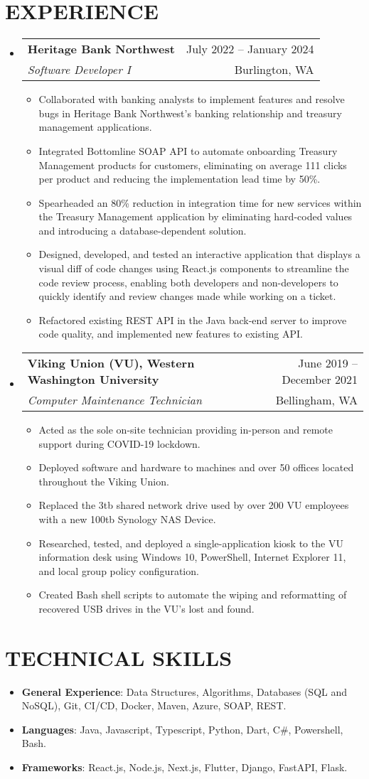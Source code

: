\documentclass[letterpaper,11pt]{article}
\makeatletter
\newcommand{\resumeItem}[1]{
    \item\small{
            {#1 \vspace{-1pt}}
        }
    }
\newcommand{\resumeSubheading}[4]{
        \vspace{-1pt}\item
        \begin{tabular*}{\textwidth}[t]{l@{\extracolsep{\fill}}r}
            \textbf{\large #1} & {\small #2}\vspace{1pt}\\ %
            \textit{#3} & {\small #4}\\ %
        \end{tabular*}\vspace{-4pt}
    }
\newcommand{\resumeSubHeadingListStart}{\begin{itemize}[leftmargin=0in, label={}]}
\newcommand{\resumeSubHeadingListEnd}{\end{itemize}}
\newcommand{\resumeItemListStart}{\begin{itemize}}
\newcommand{\resumeItemListEnd}{\end{itemize}\vspace{0pt}}
\makeatother
\begin{document}
\section{EXPERIENCE}
\resumeSubHeadingListStart

\resumeSubheading
{Heritage Bank Northwest}{July 2022 -- January 2024}
{Software Developer I}{Burlington, WA}
\resumeItemListStart
\resumeItem{Collaborated with banking analysts to implement features and resolve bugs in Heritage Bank Northwest's banking relationship and treasury management applications.}
\resumeItem{Integrated Bottomline SOAP API to automate onboarding Treasury Management products for customers, eliminating on average 111 clicks per product and reducing the implementation lead time by 50\%.}
\resumeItem{Spearheaded an 80\% reduction in integration time for new services within the Treasury Management application by eliminating hard-coded values and introducing a database-dependent solution.}
\resumeItem{Designed, developed, and tested an interactive application that displays a visual diff of code changes using React.js components to streamline the code review process, enabling both developers and non-developers to quickly identify and review changes made while working on a ticket.}
\resumeItem{Refactored existing REST API in the Java back-end server to improve code quality, and implemented new features to existing API.}
\resumeItemListEnd

\resumeSubheading
{Viking Union (VU), Western Washington University}{June 2019 -- December 2021}
{Computer Maintenance Technician}{Bellingham, WA}
\resumeItemListStart
\resumeItem{Acted as the sole on-site technician providing in-person and remote support during COVID-19 lockdown.}
\resumeItem{Deployed software and hardware to machines and over 50 offices located throughout the Viking Union.}
\resumeItem{Replaced the 3tb shared network drive used by over 200 VU employees with a new 100tb Synology NAS Device.}
\resumeItem{Researched, tested, and deployed a single-application kiosk to the VU information desk using Windows 10, PowerShell, Internet Explorer 11, and local group policy configuration.}
\resumeItem{Created Bash shell scripts to automate the wiping and reformatting of recovered USB drives in the VU’s lost and found.}
\resumeItemListEnd
\resumeSubHeadingListEnd

\section{TECHNICAL SKILLS}
\begin{itemize}[leftmargin=0in, label={}]
     \setlength\itemsep{-0.5em}  
        \item \textbf{General Experience}{: Data Structures, Algorithms, Databases (SQL and NoSQL), Git, CI/CD, Docker, Maven, Azure, SOAP, REST.}
        \item \textbf{Languages}{: Java, Javascript, Typescript, Python, Dart, C\#, Powershell, Bash.} 
        \item \textbf{Frameworks}{: React.js, Node.js, Next.js, Flutter, Django, FastAPI, Flask.}
\end{itemize}
\end{document}
